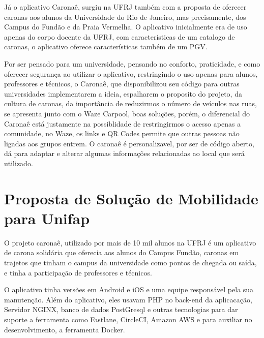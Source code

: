     Já o aplicativo Caronaê, surgiu na UFRJ também com a proposta de oferecer caronas aos alunos da Universidade do Rio de Janeiro, mas precisamente, dos Campus do Fundão e da Praia Vermelha. O aplicativo inicialmente era de uso apenas do corpo docente da UFRJ, com características de um catalogo de caronas, o aplicativo oferece características também de um PGV. 
    
    Por ser pensado para um universidade, pensando no conforto, praticidade, e como oferecer segurança ao utilizar o aplicativo, restringindo o uso apenas para alunos, professores e técnicos, o Caronaê, que disponibilizou seu código para outras universidades implementarem a ideia, espalharem o proposito do projeto, da cultura de caronas, da importância de reduzirmos o número de veículos nas ruas, se apresenta junto com o Waze Carpool, boas soluções, porém, o diferencial do Caronaê está justamente na possiblidade de restringirmos o acesso apenas a comunidade, no Waze, os links e QR Codes permite que outras pessoas não ligadas aos grupos entrem. O caronaê é personalizavel, por ser de código aberto, dá para adaptar e alterar algumas informações relacionadas ao local que será utilizado. 

\section{Proposta de Solução de Mobilidade para Unifap}

O projeto caronaê, utilizado por mais de 10 mil alunos na UFRJ é um aplicativo de carona solidária que oferecia aos alunos do Campus Fundão, caronas em trajetos que tinham o campus da universidade como pontos de chegada ou saída, e tinha a participação de professores e técnicos.

O aplicativo tinha versões em Android e iOS e uma equipe responsável pela sua manutenção. %
Além do aplicativo, eles usavam PHP no back-end da aplicacação, Servidor NGINX, banco de dados PostGresql e outras tecnologias para dar suporte a ferramenta como Fastlane, CircleCI, Amazon AWS e para auxiliar no desenvolvimento, a ferramenta Docker.


